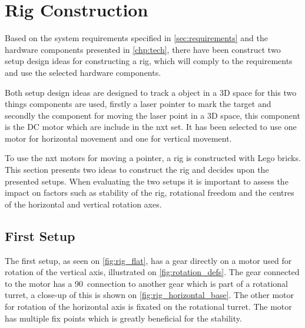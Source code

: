 \chapter{Rig Construction}\label{sc:rig}
Based on the system requirements specified in \cref{sec:requirements} and the hardware components presented in \cref{chp:tech}, there have been construct two setup design ideas for constructing a rig, which will comply to the requirements and use the selected hardware components.

Both setup design ideas are designed to track a object in a 3D space for this two things components are used, firstly a laser pointer to mark the target and secondly the component for moving the laser point in a 3D space, this component is the DC motor which are include in the \acrfull{nxt} set. It has been selected to use one motor for horizontal movement and one for vertical movement.


To use the \gls{nxt} motors for moving a pointer, a rig is constructed with Lego bricks. This section presents two ideas to construct the rig and decides upon the presented setups. When evaluating the two setups it is important to assess the impact on factors such as stability of the rig, rotational freedom and the centres of the horizontal and vertical rotation axes.

\section{First Setup}\label{sec:first_setup}
The first setup, as seen on \cref{fig:rig_flat}, has a gear directly on a motor used for rotation of the vertical axis, illustrated on \cref{fig:rotation_defs}. The gear connected to the motor has a 90\degree\ connection to another gear which is part of a rotational turret, a close-up of this is shown on \cref{fig:rig_horizontal_base}. The other motor for rotation of the horizontal axis is fixated on the rotational turret. The motor has multiple fix points which is greatly beneficial for the stability.


